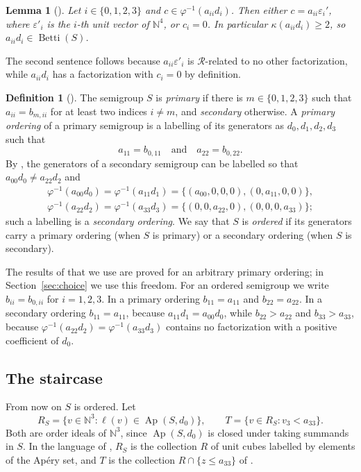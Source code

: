 \documentclass{amsart}
\newtheorem{lemma}[theorem]{Lemma}
\theoremstyle{definition}
\newtheorem{definition}[theorem]{Definition}
\theoremstyle{remark}
\numberwithin{equation}{section}
\newcommand{\N}{\mathbb{N}}
\newcommand{\cR}{\mathcal{R}}
\newcommand{\Ap}{\operatorname{Ap}}
\DeclareMathOperator{\Betti}{Betti}
\newcommand{\wt}{\ell}
\newcommand{\Apd}{\Ap(S,d_0)}
\begin{document}
\begin{lemma}[{\cite[Lemma~2.1]{Cho26}}]\label{lem:aii}
Let $i\in\{0,1,2,3\}$ and $c\in\varphi^{-1}(a_{ii}d_i)$. Then either $c=a_{ii}\varepsilon_i'$, where $\varepsilon'_i$ is the $i$-th unit vector of $\N^4$, or $c_i=0$. In particular $\kappa(a_{ii}d_i)\ge2$, so $a_{ii}d_i\in\Betti(S)$.
\end{lemma}

The second sentence follows because $a_{ii}\varepsilon'_i$ is $\cR$-related to no other factorization, while $a_{ii}d_i$ has a factorization with $c_i=0$ by definition.

\begin{definition}[{\cite[Section~2.1]{Cho26}}]\label{def:ordered}
The semigroup $S$ is \emph{primary} if there is $m\in\{0,1,2,3\}$ such that $a_{ii}=b_{m,ii}$ for at least two indices $i\neq m$, and \emph{secondary} otherwise. A \emph{primary ordering} of a primary semigroup is a labelling of its generators as $d_0,d_1,d_2,d_3$ such that
\[
a_{11}=b_{0,11}\quad\text{and}\quad a_{22}=b_{0,22}.
\]
By \cite[Lemma~2.2]{Cho26}, the generators of a secondary semigroup can be labelled so that $a_{00}d_0\neq a_{22}d_2$ and
\begin{gather*}
\varphi^{-1}(a_{00}d_0)=\varphi^{-1}(a_{11}d_1)=\{(a_{00},0,0,0),(0,a_{11},0,0)\},\\
\varphi^{-1}(a_{22}d_2)=\varphi^{-1}(a_{33}d_3)=\{(0,0,a_{22},0),(0,0,0,a_{33})\};
\end{gather*}
such a labelling is a \emph{secondary ordering}. We say that $S$ is \emph{ordered} if its generators carry a primary ordering (when $S$ is primary) or a secondary ordering (when $S$ is secondary).
\end{definition}

The results of \cite{Cho26} that we use are proved for an arbitrary primary ordering; in Section~\ref{sec:choice} we use this freedom. For an ordered semigroup we write $b_{ii}=b_{0,ii}$ for $i=1,2,3$. In a primary ordering $b_{11}=a_{11}$ and $b_{22}=a_{22}$. In a secondary ordering $b_{11}=a_{11}$, because $a_{11}d_1=a_{00}d_0$, while $b_{22}>a_{22}$ and $b_{33}>a_{33}$, because $\varphi^{-1}(a_{22}d_2)=\varphi^{-1}(a_{33}d_3)$ contains no factorization with a positive coefficient of $d_0$.

\subsection{The staircase}

From now on $S$ is ordered. Let
\[
R_S=\{v\in\N^3 : \wt(v)\in\Apd\},\qquad T=\{v\in R_S : v_3<a_{33}\}.
\]
Both are order ideals of $\N^3$, since $\Apd$ is closed under taking summands in $S$. In the language of \cite{Cho26}, $R_S$ is the collection $R$ of unit cubes labelled by elements of the Ap\'ery set, and $T$ is the collection $R\cap\{z\le a_{33}\}$ of \cite[Section~3]{Cho26}.
\end{document}
